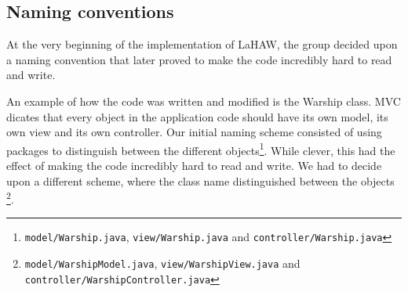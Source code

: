 \subsection{Naming conventions}
\label{sec:naming_conventions}
At the very beginning of the implementation of LaHAW, the group decided upon a naming convention that later proved to make the code incredibly hard to read and write.

An example of how the code was written and modified is the Warship class. MVC dicates that every object in the application code should have its own model, its own view and its own controller. Our initial naming scheme consisted of using packages to distinguish between the different objects{\footnote{\texttt{model/Warship.java}, \texttt{view/Warship.java} and \texttt{controller/Warship.java}}}. While clever, this had the effect of making the code incredibly hard to read and write. %
We had to decide upon a different scheme, where the class name distinguished between the objects \footnote{\texttt{model/WarshipModel.java}, \texttt{view/WarshipView.java} and \texttt{controller/WarshipController.java}}.
